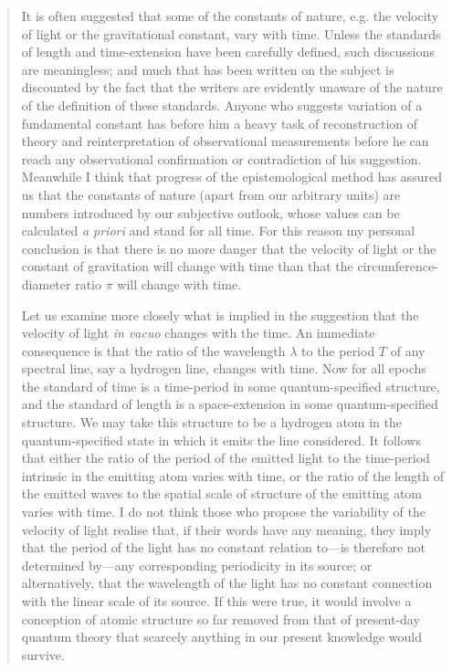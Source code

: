 \begin{quote}
    It is often suggested that some of the constants of nature, e.g. the velocity of light or the gravitational constant, vary with time.  Unless the standards of length and time-extension have been carefully defined, such discussions are meaningless; and much that has been written on the subject is discounted by the fact that the writers are evidently unaware of the nature of the definition of these standards.  Anyone who suggests variation of a fundamental constant has before him a heavy task of reconstruction of theory and reinterpretation of observational measurements before he can reach any observational confirmation or contradiction of his suggestion.  Meanwhile I think that progress of the epistemological method has assured us that the constants of nature (apart from our arbitrary units) are numbers introduced by our subjective outlook, whose values can be calculated \emph{a priori} and stand for all time.  For this reason my personal conclusion is that there is no more danger that the velocity of light or the constant of gravitation will change with time than that the circumference-diameter ratio $\pi$ will change with time.
    
    Let us examine more closely what is implied in the suggestion that the velocity of light \emph{in vacuo} changes with the time.  An immediate consequence is that the ratio of the wavelength $\lambda$ to the period $T$ of any spectral line, say a hydrogen line, changes with time.  Now for all epochs the standard of time is a time-period in some quantum-specified structure, and the standard of length is a space-extension in some quantum-specified structure.  We may take this structure to be a hydrogen atom in the quantum-specified state in which it emits the line considered.  It follows that either the ratio of the period of the emitted light to the time-period intrinsic in the emitting atom varies with time, or the ratio of the length of the emitted waves to the spatial scale of structure of the emitting atom varies with time.  I do not think those who propose the variability of the velocity of light realise that, if their words have any meaning, they imply that the period of the light has no constant relation to---is therefore not determined by---any corresponding periodicity in its source; or alternatively, that the wavelength of the light has no constant connection with the linear scale of its source.  If this were true, it would involve a conception of atomic structure so far removed from that of present-day quantum theory that scarcely anything in our present knowledge would survive.  
    
    \citep[p. 77-79]{Eddington1939}
\end{quote}

